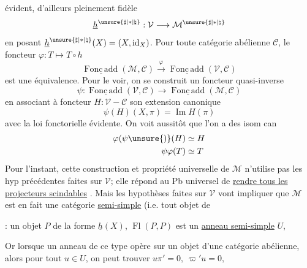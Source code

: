 évident, d'ailleurs pleinement fidèle
\[
\underline h^{\unsure{\sharp|*|\natural}}:\mathcal V\longrightarrow\mathcal M^{\unsure{\sharp|*|\natural}}
\]
en posant \(\underline h^{\unsure{\sharp|*|\natural}}(X)=(X,\operatorname{id}_X)\).
Pour toute catégorie
abélienne \(\mathcal C\), le foncteur \(\varphi:T\longmapsto T\circ h\)
\[
\underline{\operatorname{Fonc\,add}}(\mathcal M,\mathcal C)
\xrightarrow{\varphi}
\underline{\operatorname{Fonc\,add}}(\mathcal V,\mathcal C)
\]
est une  équivalence. Pour le voir, on
se construit un foncteur quasi-inverse
\[
\psi:\underline{\operatorname{Fonc\,add}}(\mathcal V,\mathcal C)
\longrightarrow
\underline{\operatorname{Fonc\,add}}(\mathcal M,\mathcal C)
\]
en associant à  foncteur 
\(H:\mathcal V\mathbin{-}\mathcal C\)
son extension canonique
\[
\psi(H)(X,\pi)=\operatorname{Im}H(\pi)
\]
avec la loi fonctorielle évidente. On voit
aussitôt que l'on a des isom can
\[
\begin{aligned}
\varphi(\psi\unsure{)}(H)&\simeq H\\
\psi\varphi(T)&\simeq T
\end{aligned}
\]
Pour l'instant, cette construction et propriété
universelle de \(\mathcal M\) n'utilise pas les hyp
précédentes faites sur \(\mathcal V\); elle répond au Pb
universel de \uline{rendre tous les projecteurs
scindables} .
Mais les hypothèses faites
sur \(\mathcal V\) vont impliquer que \(\mathcal M\) est en
fait une catégorie  \uline{semi-simple}
(i.e. tout objet de


: un objet
\(P\) de la forme \(\underline h(X)\),
\(\operatorname{Fl}(P,P)\) est un \uline{anneau semi-simple} \(U\), 

Or lorsque un anneau de ce type opère
sur un objet d'une catégorie abélienne, alors
pour tout \(u\in U\), on peut trouver
\(u\pi'=0,\ \varpi'u=0,\)

